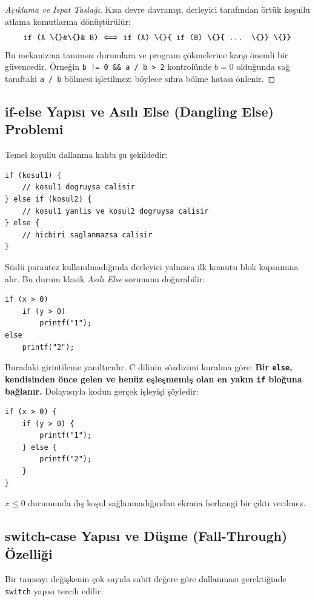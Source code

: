 \begin{proof}[Açıklama ve İspat Taslağı]
Kısa devre davranışı, derleyici tarafından örtük koşullu atlama komutlarına dönüştürülür:
{\small\[
\text{\texttt{if (A \textbackslash\{\}\&\textbackslash\{\}\& B)}} \iff \text{\texttt{if (A) \textbackslash\{\}\{ if (B) \textbackslash\{\}\{ ... \textbackslash\{\}\} \textbackslash\{\}\}}}
\]}
Bu mekanizma tanımsız durumlara ve program çökmelerine karşı önemli bir güvencedir. Örneğin \texttt{b != 0 \&\& a / b > 2} kontrolünde $b=0$ olduğunda sağ taraftaki \texttt{a / b} bölmesi işletilmez; böylece sıfıra bölme hatası önlenir.
\end{proof}

\subsection{if-else Yapısı ve Asılı Else (Dangling Else) Problemi}

Temel koşullu dallanma kalıbı şu şekildedir:
\begin{lstlisting}[language=CTemel]
if (kosul1) {
    // kosul1 dogruysa calisir
} else if (kosul2) {
    // kosul1 yanlis ve kosul2 dogruysa calisir
} else {
    // hicbiri saglanmazsa calisir
}
\end{lstlisting}

Süslü parantez kullanılmadığında derleyici yalnızca ilk komutu blok kapsamına alır. Bu durum klasik \textit{Asılı Else} sorununu doğurabilir:
\begin{lstlisting}[language=CTemel]
if (x > 0)
    if (y > 0)
        printf("1");
else
    printf("2");
\end{lstlisting}
Buradaki girintileme yanıltıcıdır. C dilinin sözdizimi kuralına göre: \textbf{Bir \texttt{else}, kendisinden önce gelen ve henüz eşleşmemiş olan en yakın \texttt{if} bloğuna bağlanır.} Dolayısıyla kodun gerçek işleyişi şöyledir:
\begin{lstlisting}[language=CTemel]
if (x > 0) {
    if (y > 0) {
        printf("1");
    } else {
        printf("2");
    }
}
\end{lstlisting}
$x \le 0$ durumunda dış koşul sağlanmadığından ekrana herhangi bir çıktı verilmez.

\subsection{switch-case Yapısı ve Düşme (Fall-Through) Özelliği}

Bir tamsayı değişkenin çok sayıda sabit değere göre dallanması gerektiğinde \texttt{switch} yapısı tercih edilir:

